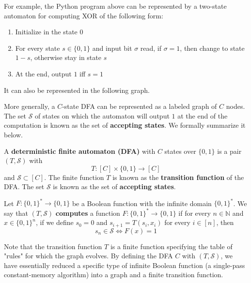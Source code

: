   For example, the Python program above can be represented by a two-state automaton for computing XOR of the following form:
  \begin{enumerate}
      \item Initialize in the state 0
      \item For every state $s \in \{0,1\}$ and input bit $\sigma$ read, if $\sigma = 1$, then change to state $1-s$, otherwise stay in state $s$
      \item At the end, output $1$ iff $s = 1$
  \end{enumerate}
  It can also be represented in the following graph. 
  \begin{center}
  \end{center}
  More generally, a $C$-state DFA can be represented as a labeled graph of $C$ nodes. The set $\mathcal{S}$ of states on which the automaton will output $1$ at the end of the computation is known as the set of \textbf{accepting states}. We formally summarize it below. 

  \begin{definition}
  A \textbf{deterministic finite automaton (DFA)} with $C$ states over $\{0, 1\}$ is a pair $(T, \mathcal{S})$ with
  \[T: [C] \times \{0,1\} \longrightarrow [C]\]
  and $\mathcal{S} \subset [C]$. The finite function $T$ is known as the \textbf{transition function} of the DFA. The set $\mathcal{S}$ is known as the set of \textbf{accepting states}. 

  Let $F: \{0,1\}^* \longrightarrow \{0,1\}$ be a Boolean function with the infinite domain $\{0,1\}^*$. We say that $(T, \mathcal{S})$ \textbf{computes} a function $F: \{0,1\}^* \longrightarrow \{0,1\}$ if for every $n \in \mathbb{N}$ and $x \in \{0,1\}^n$, if we define $s_0 = 0$ and $s_{i+1} = T(s_i, x_i)$ for every $i \in [n]$, then 
  \[s_n \in \mathcal{S} \iff F(x) = 1\]
  \end{definition}

  Note that the transition function $T$ is a finite function specifying the table of "rules" for which the graph evolves. By defining the DFA $C$ with $(T, \mathcal{S})$, we have essentially reduced a specific type of infinite Boolean function (a single-pass constant-memory algorithm) into a graph and a finite transition function. 

